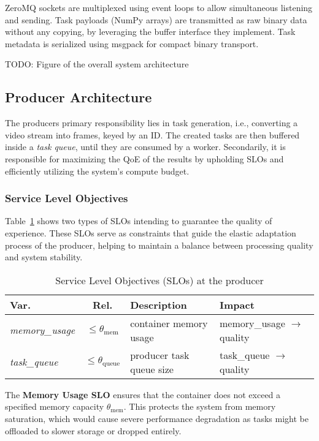 ZeroMQ sockets are multiplexed using event loops to allow simultaneous listening and sending. Task payloads (NumPy arrays) are transmitted as raw binary data without any copying, by leveraging the buffer interface they implement. Task metadata is serialized using msgpack \cite{noauthor_msgpackmsgpack-python_nodate} for compact binary transport.


TODO: Figure of the overall system architecture

\subsection{Producer Architecture}
The producers primary responsibility lies in task generation, i.e., converting a video stream into frames, keyed by an ID. The created tasks are then buffered inside a \textit{task queue}, until they are consumed by a worker. Secondarily, it is responsible for maximizing the QoE of the results by upholding SLOs and efficiently utilizing the system's compute budget.

\subsubsection{Service Level Objectives}
Table~\ref{tab:slo-table} shows two types of SLOs intending to guarantee the quality of experience. These SLOs serve as constraints that guide the elastic adaptation process of the producer, helping to maintain a balance between processing quality and system stability.

\begin{table}[h]
    \centering
    \begin{tabular}{@{}lcll@{}}
        \toprule
        \textbf{Var.} & \textbf{Rel.} & \textbf{Description} & \textbf{Impact} \\
        \midrule
        \textit{memory\_usage} & $\leq \theta_\text{mem}$ & container memory usage & memory\_usage $\rightarrow$ quality \\
        \textit{task\_queue} & $\leq \theta_\text{queue}$ & producer task queue size & task\_queue $\rightarrow$ quality \\
        \bottomrule
    \end{tabular}
    \caption{Service Level Objectives (SLOs) at the producer}
    \label{tab:slo-table}
\end{table}


The \textbf{Memory Usage SLO} ensures that the container does not exceed a specified memory capacity \(\theta_\text{mem}\). This protects the system from memory saturation, which would cause severe performance degradation as tasks might be offloaded to slower storage or dropped entirely.

